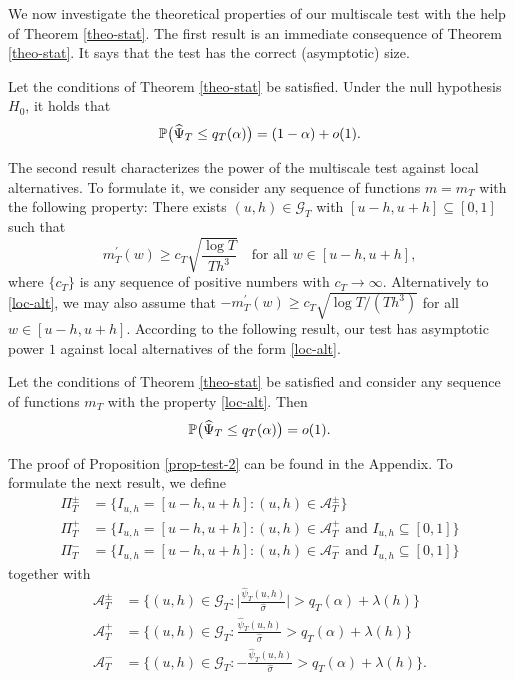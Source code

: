 We now investigate the theoretical properties of our multiscale test with the help of Theorem \ref{theo-stat}. The first result is an immediate consequence of Theorem \ref{theo-stat}. It says that the test has the correct (asymptotic) size. 
\begin{prop}\label{prop-test-1}
Let the conditions of Theorem \ref{theo-stat} be satisfied. Under the null hypothesis $H_0$, it holds that 
\[ \mathbb{P} \big( \widehat{\Psi}_T \le q_T(\alpha) \big) = (1 - \alpha) + o(1). \]
\end{prop}
The second result characterizes the power of the multiscale test against local alternatives. To formulate it, we consider any sequence of functions $m = m_T$ with the following property: There exists $(u,h) \in \mathcal{G}_T$ with $[u-h,u+h] \subseteq [0,1]$ such that 
\begin{equation}\label{loc-alt}
m_T^\prime(w) \ge c_T \sqrt{\frac{\log T}{Th^3}} \quad \text{for all } w \in [u-h,u+h], 
\end{equation}
where $\{c_T\}$ is any sequence of positive numbers with $c_T \rightarrow \infty$. Alternatively to \eqref{loc-alt}, we may also assume that $-m_T^\prime(w) \ge c_T \sqrt{\log T/(Th^3)}$ for all $w \in [u-h,u+h]$. According to the following result, our test has asymptotic power $1$ against local alternatives of the form \eqref{loc-alt}. 
\begin{prop}\label{prop-test-2}
Let the conditions of Theorem \ref{theo-stat} be satisfied and consider any sequence of functions $m_T$ with the property \eqref{loc-alt}. Then 
\[ \mathbb{P} \big( \widehat{\Psi}_T \le q_T(\alpha) \big) = o(1). \]
\end{prop}
The proof of Proposition \ref{prop-test-2} can be found in the Appendix. To formulate the next result, we define 
\begin{align*}
\Pi_T^\pm   & = \big\{ I_{u,h} = [u-h,u+h]: (u,h) \in \mathcal{A}_T^\pm \big\} \\
\Pi_T^+ & = \big\{ I_{u,h} = [u-h,u+h]: (u,h) \in \mathcal{A}_T^+ \text{ and } I_{u,h} \subseteq [0,1] \big\} \\
\Pi_T^- & = \big\{ I_{u,h} = [u-h,u+h]: (u,h) \in \mathcal{A}_T^- \text{ and } I_{u,h} \subseteq [0,1] \big\} 
\end{align*}
together with 
\begin{align*}
\mathcal{A}_T^\pm & = \Big\{ (u,h) \in \mathcal{G}_T: \Big|\frac{\widehat{\psi}_T(u,h)}{\widehat{\sigma}}\Big| > q_T(\alpha) + \lambda(h) \Big\} \\ 
\mathcal{A}_T^+  & = \Big\{ (u,h) \in \mathcal{G}_T: \frac{\widehat{\psi}_T(u,h)}{\widehat{\sigma}} > q_T(\alpha) + \lambda(h) \Big\} \\ 
\mathcal{A}_T^-  & = \Big\{ (u,h) \in \mathcal{G}_T: -\frac{\widehat{\psi}_T(u,h)}{\widehat{\sigma}} > q_T(\alpha) + \lambda(h) \Big\}. 
\end{align*}
